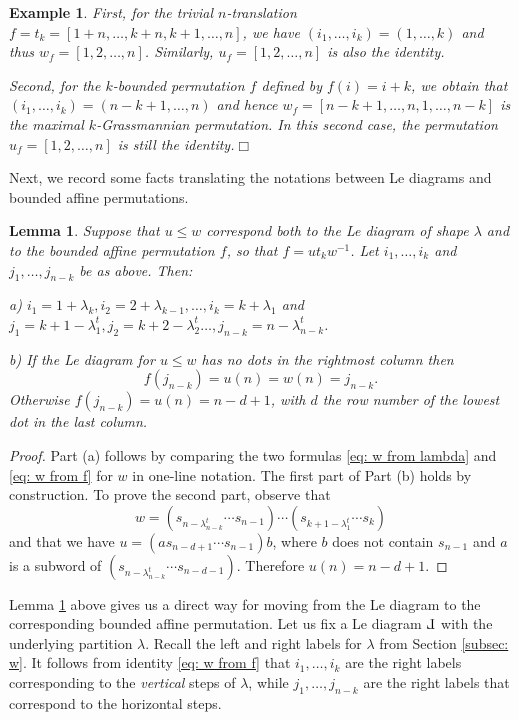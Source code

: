 \documentclass[10pt]{amsart}
\theoremstyle{plain}
\newtheorem{lemma}[thm]{Lemma}
\newtheorem{example}[thm]{Example}
\theoremstyle{definition}
\theoremstyle{remark}
\numberwithin{equation}{section}
\newcommand{\la}{\lambda}
\def\Le{\reflectbox{$\mathrm{L}$}}
\begin{document}
\begin{example}
First, for the trivial $n$-translation $f=t_{k} = [1+n, \dots, k+n, k+1, \dots, n]$, we have $(i_{1}, \dots, i_{k}) = (1, \dots, k)$ and thus $w_f = [1, 2, \dots, n]$. Similarly, $u_f = [1, 2, \dots, n]$ is also the identity. 

Second, for the $k$-bounded permutation $f$ defined by $f(i)=i+k$, we obtain that $(i_{1}, \dots, i_{k}) = (n-k+1, \dots, n)$ and hence $w_f = [n-k+1, \dots, n, 1, \dots, n-k]$ %
is the maximal $k$-Grassmannian permutation. In this second case, the permutation $u_f = [1, 2, \dots, n]$ is still the identity.\hfill$\Box$
\end{example}

\noindent Next, we record some facts translating the notations between Le diagrams and bounded affine permutations. 

\begin{lemma}
\label{lem: Le and f}
Suppose that $u\le w$ correspond both to the Le diagram of shape $\lambda$ and to the bounded affine permutation $f$, so that $f = ut_{k}w^{-1}$. Let $i_1,\ldots,i_k$ and $j_1,\ldots,j_{n-k}$ be as above. Then:

a) $i_1=1+\lambda_k, i_2 = 2 + \lambda_{k-1}, \ldots,i_k=k+\lambda_1$ and  $j_1=k+1-\lambda_1^t, j_2 = k+2-\lambda_{2}^{t}\ldots, j_{n-k}=n-\lambda_{n-k}^t$.

b) If the Le diagram for $u\leq w$ has no dots in the rightmost column then 
$$f(j_{n-k})=u(n)=w(n)=j_{n-k}.$$ Otherwise $f(j_{n-k})=u(n)=n-d+1$, with $d$ the row number of the lowest dot in the last column.
\end{lemma}

\begin{proof}
Part (a) follows by comparing the two formulas  \eqref{eq: w from lambda} and \eqref{eq: w from f} for $w$ in one-line notation. The first part of Part (b) holds by construction.  To prove the second part, observe that 
$$
w=(s_{n-\lambda_{n-k}^t}\cdots s_{n-1})\cdots (s_{k+1-\lambda_1^{t}}\cdots s_{k})
$$
and that we have
$
u=(as_{n-d+1}\cdots s_{n-1})b
$,
where $b$ does not contain $s_{n-1}$ and $a$ is a subword of $(s_{n-\lambda_{n-k}^t}\cdots s_{n-d-1})$.
Therefore $u(n)=n-d+1$.
\end{proof}

Lemma \ref{lem: Le and f} above gives us a direct way for moving from the Le diagram to the corresponding bounded affine permutation. Let us fix a Le diagram $\Le$ with the underlying partition $\lambda$. Recall the left and right labels for $\lambda$ from Section \ref{subsec: w}.
It follows from identity \eqref{eq: w from f} that $i_{1}, \dots, i_{k}$ are the right labels corresponding to the \emph{vertical} steps of $\la$, while $j_1, \dots, j_{n-k}$ are the right labels that correspond to the horizontal steps. 
\end{document}
